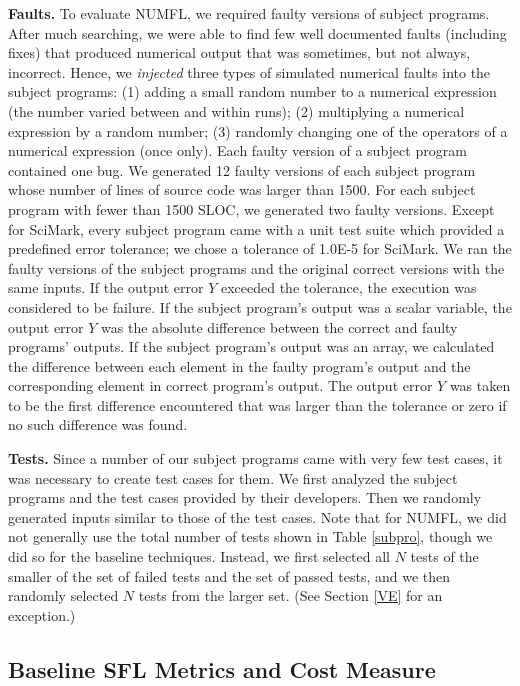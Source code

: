{\bf Faults.}  To evaluate NUMFL, we required faulty versions of subject programs.  After much searching, we were able to find few well documented faults (including fixes) that produced numerical output that was sometimes, but not always, incorrect.  Hence, we {\it injected} three types of simulated numerical faults into the subject programs: (1) adding a small random number to a numerical expression (the number varied between and within runs); (2) multiplying a numerical expression by a random number; (3) randomly changing one of the operators of a numerical expression (once only).  Each faulty version of a subject program contained one bug.  We generated 12 faulty versions of each subject program whose number of lines of source code was larger than 1500.  For each subject program with fewer than 1500 SLOC, we generated two faulty versions.  Except for SciMark, every subject program came with a unit test suite which provided a predefined error tolerance; we chose a tolerance of 1.0E-5 for SciMark.  We ran the faulty versions of the subject programs and the original correct versions with the same inputs.  If the output error $Y$ exceeded the tolerance, the execution was considered to be failure.  If the subject program's output was a scalar variable, the output error $Y$ was the absolute difference between the correct and faulty programs' outputs.  If the subject program's output was an array, we calculated the difference between each element in the faulty program's output and the corresponding element in correct program's output.  The output error $Y$ was taken to be the first difference encountered that was larger than the tolerance or zero if no such difference was found.


{\bf Tests.}  Since a number of our subject programs came with very few test cases, it was necessary to create test cases for them.  We first analyzed the subject programs and the test cases provided by their developers. Then we randomly generated inputs similar to those of the test cases. Note that for NUMFL, we did not generally use the total number of tests shown in Table \ref{subpro}, though we did so for the baseline techniques.  Instead, we first selected all $N$ tests of the smaller of the set of failed tests and the set of passed tests, and we then randomly selected $N$ tests from the larger set. (See Section \ref{VE} for an exception.)

\subsection{Baseline SFL Metrics and Cost Measure}

